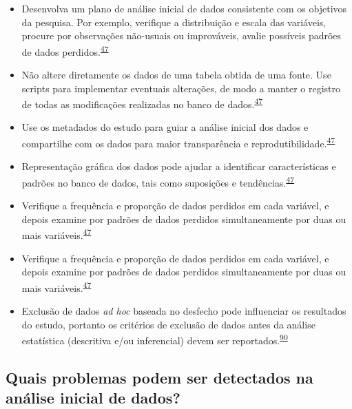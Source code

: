 \documentclass[
  a4paper,
]{book}
\begin{document}
\begin{itemize}
\item
  Desenvolva um plano de análise inicial de dados consistente com os objetivos da pesquisa. Por exemplo, verifique a distribuição e escala das variáveis, procure por observações não-usuais ou improváveis, avalie possíveis padrões de dados perdidos.\textsuperscript{\protect\hyperlink{ref-Baillie2022}{47}}
\item
  Não altere diretamente os dados de uma tabela obtida de uma fonte. Use scripts para implementar eventuais alterações, de modo a manter o registro de todas as modificações realizadas no banco de dados.\textsuperscript{\protect\hyperlink{ref-Baillie2022}{47}}
\item
  Use os metadados do estudo para guiar a análise inicial dos dados e compartilhe com os dados para maior transparência e reprodutibilidade.\textsuperscript{\protect\hyperlink{ref-Baillie2022}{47}}
\item
  Representação gráfica dos dados pode ajudar a identificar características e padrões no banco de dados, tais como suposições e tendências.\textsuperscript{\protect\hyperlink{ref-Baillie2022}{47}}
\item
  Verifique a frequência e proporção de dados perdidos em cada variável, e depois examine por padrões de dados perdidos simultaneamente por duas ou mais variáveis.\textsuperscript{\protect\hyperlink{ref-Baillie2022}{47}}
\item
  Verifique a frequência e proporção de dados perdidos em cada variável, e depois examine por padrões de dados perdidos simultaneamente por duas ou mais variáveis.\textsuperscript{\protect\hyperlink{ref-Baillie2022}{47}}
\item
  Exclusão de dados \emph{ad hoc} baseada no desfecho pode influenciar os resultados do estudo, portanto os critérios de exclusão de dados antes da análise estatística (descritiva e/ou inferencial) devem ser reportados.\textsuperscript{\protect\hyperlink{ref-Landis2012}{90}}
\end{itemize}

\hypertarget{quais-problemas-podem-ser-detectados-na-anuxe1lise-inicial-de-dados}{%
\subsection{Quais problemas podem ser detectados na análise inicial de dados?}\label{quais-problemas-podem-ser-detectados-na-anuxe1lise-inicial-de-dados}}
\end{document}
